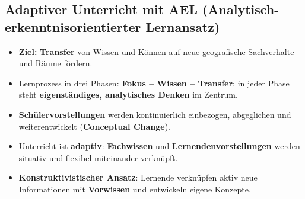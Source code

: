 \subsection{Adaptiver Unterricht mit AEL (Analytisch-erkenntnisorientierter Lernansatz)}
\begin{itemize}
  \item \textbf{Ziel:} \textbf{Transfer} von Wissen und Können auf neue geografische Sachverhalte und Räume fördern.
  \item Lernprozess in drei Phasen: \textbf{Fokus -- Wissen -- Transfer}; in jeder Phase steht \textbf{eigenständiges, analytisches Denken} im Zentrum.
  \item \textbf{Schülervorstellungen} werden kontinuierlich einbezogen, abgeglichen und weiterentwickelt (\textbf{Conceptual Change}).
  \item Unterricht ist \textbf{adaptiv}: \textbf{Fachwissen} und \textbf{Lernendenvorstellungen} werden situativ und flexibel miteinander verknüpft.
  \item \textbf{Konstruktivistischer Ansatz}: Lernende verknüpfen aktiv neue Informationen mit \textbf{Vorwissen} und entwickeln eigene Konzepte.
\end{itemize}


